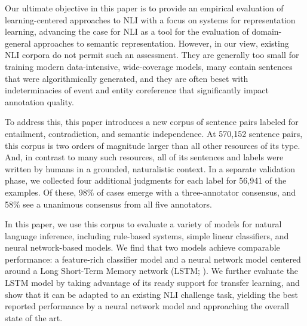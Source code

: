 Our ultimate objective in this paper is to provide an empirical
evaluation of learning-centered approaches to NLI with a focus on
systems for representation learning,
advancing the case for NLI as a tool for the evaluation of 
domain-general approaches to semantic representation. 
However, in our view, existing NLI corpora do not
permit such an assessment. They are generally too small for training
modern data-intensive, wide-coverage models, many contain sentences
that were algorithmically generated, and they are often beset with
indeterminacies of event and entity coreference that significantly
impact annotation quality.

To address this, this paper introduces a new corpus of sentence pairs labeled for
entailment, contradiction, and semantic independence. At 570,152
sentence pairs, this corpus is two orders of magnitude larger than all
other resources of its type. And, in contrast to many such resources,
all of its sentences and labels were written by humans in a grounded,
naturalistic context. In a separate validation phase, we collected
four additional judgments for each label for 56,941 of the examples.
Of these, 98\% of cases emerge with a three-annotator consensus, 
and 58\% see a unanimous consensus from all five annotators.

In this paper, we use this corpus to evaluate a variety of models
for natural language inference, including rule-based systems, simple
linear classifiers, and neural network-based models. 
We find that two models achieve comparable performance: a feature-rich
classifier model and a neural network model centered around a Long Short-Term Memory network (LSTM; 
\citealt{hochreiter1997long}). We further evaluate the LSTM model
by taking advantage of its ready support for transfer learning, and show that it can be adapted to an existing
NLI challenge task, yielding the best reported performance by a neural network model and approaching the overall state of the art.





